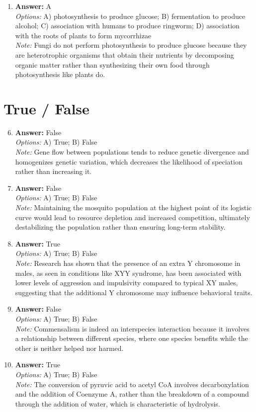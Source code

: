 \documentclass[12pt]{article}
\begin{document}
\begin{enumerate}[label=\arabic*.]
\item \textbf{Answer:} A
\\ \textit{Options:} A) photosynthesis to produce glucose; B) fermentation to produce alcohol; C) association with humans to produce ringworm; D) association with the roots of plants to form mycorrhizae
\\ \textit{Note:} Fungi do not perform photosynthesis to produce glucose because they are heterotrophic organisms that obtain their nutrients by decomposing organic matter rather than synthesizing their own food through photosynthesis like plants do.
\end{enumerate}

\section*{True / False}
\begin{enumerate}[label=\arabic*.]
\setcounter{enumi}{5}
\item \textbf{Answer:} False
\\ \textit{Options:} A) True; B) False
\\ \textit{Note:} Gene flow between populations tends to reduce genetic divergence and homogenizes genetic variation, which decreases the likelihood of speciation rather than increasing it.
\item \textbf{Answer:} False
\\ \textit{Options:} A) True; B) False
\\ \textit{Note:} Maintaining the mosquito population at the highest point of its logistic curve would lead to resource depletion and increased competition, ultimately destabilizing the population rather than ensuring long-term stability.
\item \textbf{Answer:} True
\\ \textit{Options:} A) True; B) False
\\ \textit{Note:} Research has shown that the presence of an extra Y chromosome in males, as seen in conditions like XYY syndrome, has been associated with lower levels of aggression and impulsivity compared to typical XY males, suggesting that the additional Y chromosome may influence behavioral traits.
\item \textbf{Answer:} False
\\ \textit{Options:} A) True; B) False
\\ \textit{Note:} Commensalism is indeed an interspecies interaction because it involves a relationship between different species, where one species benefits while the other is neither helped nor harmed.
\item \textbf{Answer:} True
\\ \textit{Options:} A) True; B) False
\\ \textit{Note:} The conversion of pyruvic acid to acetyl CoA involves decarboxylation and the addition of Coenzyme A, rather than the breakdown of a compound through the addition of water, which is characteristic of hydrolysis.
\end{enumerate}
\end{document}
